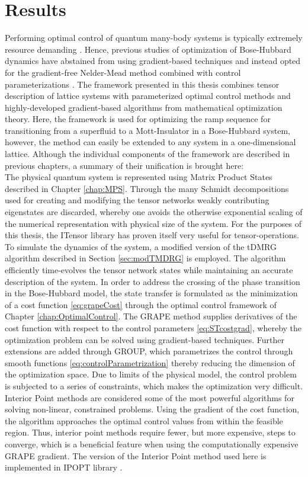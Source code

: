 \chapter{Results}

Performing optimal control of quantum many-body systems is typically extremely resource demanding \cite{Mennemann2015}. Hence, previous studies of optimization of Bose-Hubbard dynamics have abstained from using gradient-based techniques and instead opted for the gradient-free Nelder-Mead method combined with control parameterizations \cite{Doria2011,FrankBloch}. The framework presented in this thesis combines tensor description of lattice systems with parameterized optimal control methods and highly-developed gradient-based algorithms from mathematical optimization theory. Here, the framework is used for optimizing the ramp sequence for transitioning from a superfluid to a Mott-Insulator in a Bose-Hubbard system, however, the method can easily be extended to any system in a one-dimensional lattice.
Although the individual components of the framework are described in previous chapters, a summary of their unification is brought here:\\
The physical quantum system is represented using Matrix Product States described in Chapter \ref{chap:MPS}. Through the many Schmidt decompositions used for creating and modifying the tensor networks weakly contributing eigenstates are discarded, whereby one avoids the otherwise exponential scaling of the numerical representation with physical size of the system. For the purposes of this thesis, the ITensor library \cite{ITensor} has proven itself very useful for tensor-operations.
To simulate the dynamics of the system, a modified version of the tDMRG algorithm described in Section \ref{sec:modTMDRG} is employed. The algorithm efficiently time-evolves the tensor network states while maintaining an accurate description of the system.
In order to address the crossing of the phase transition in the Bose-Hubbard model, the state transfer is formulated as the minimization of a cost function \eqref{eq:grapeCost} through the optimal control framework of Chapter \ref{chap:OptimalControl}. The GRAPE method supplies derivatives of the cost function with respect to the control parameters \eqref{eq:STcostgrad}, whereby the optimization problem can be solved using gradient-based techniques. Further extensions are added through GROUP, which parametrizes the control through smooth functions \eqref{eq:controlParametrization} thereby reducing the dimension of the optimization space.
Due to limits of the physical model, the control problem is subjected to a series of constraints, which makes the optimization very difficult. 
Interior Point methods are considered some of the most powerful algorithms for solving non-linear, constrained problems. Using the gradient of the cost function, the algorithm approaches the optimal control values from within the feasible region. Thus, interior point methods require fewer, but more expensive, steps to converge, which is a beneficial feature when using the computationally expensive GRAPE gradient. The version of the Interior Point method used here is implemented in IPOPT library \cite{Wachter2006}.\\

